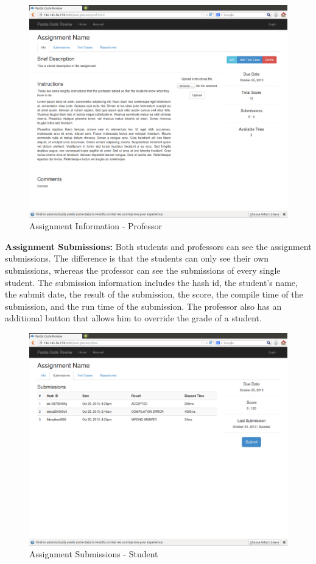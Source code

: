 \begin{figure}[H]
	\centering
	\includegraphics[width=\textwidth]{img/assignment-info-prof}
	\caption{Assignment Information - Professor}
\end{figure}

\textbf{Assignment Submissions:} Both students and professors can see the
assignment submissions. The difference is that the students can only see their
own submissions, whereas the professor can see the submissions of every single
student. The submission information includes the hash id, the student's
name, the submit date, the result of the submission, the score, the compile time
of the submission, and the run time of the submission. The professor also
has an additional button that allows him to override the grade of a student.

\begin{figure}[H]
	\centering
	\includegraphics[width=\textwidth]{img/assignment-sub}
	\caption{Assignment Submissions - Student}
\end{figure}

